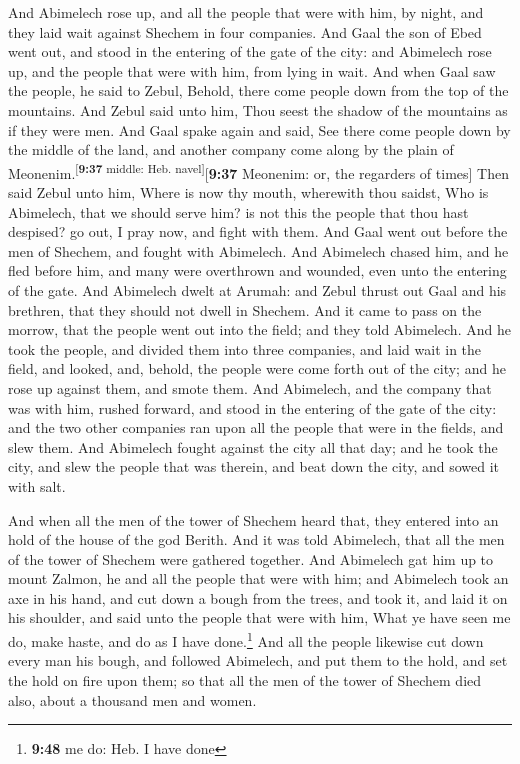  And Abimelech rose up, and all the people that were with
him, by night, and they laid wait against Shechem in four companies.
 And Gaal the son of Ebed went out, and stood in the
entering of the gate of the city: and Abimelech rose up, and the people
that were with him, from lying in wait.  And when Gaal
saw the people, he said to Zebul, Behold, there come people down from
the top of the mountains. And Zebul said unto him, Thou seest the shadow
of the mountains as if they were men.  And Gaal spake
again and said, See there come people down by the middle of the land,
and another company come along by the plain of
Meonenim.\textsuperscript{{[}\textbf{9:37} middle: Heb.
navel{]}}{[}\textbf{9:37} Meonenim: or, the regarders of times{]}
 Then said Zebul unto him, Where is now thy mouth,
wherewith thou saidst, Who is Abimelech, that we should serve him? is
not this the people that thou hast despised? go out, I pray now, and
fight with them.  And Gaal went out before the men of
Shechem, and fought with Abimelech.  And Abimelech chased
him, and he fled before him, and many were overthrown and wounded, even
unto the entering of the gate.  And Abimelech dwelt at
Arumah: and Zebul thrust out Gaal and his brethren, that they should not
dwell in Shechem.  And it came to pass on the morrow,
that the people went out into the field; and they told Abimelech.
 And he took the people, and divided them into three
companies, and laid wait in the field, and looked, and, behold, the
people were come forth out of the city; and he rose up against them, and
smote them.  And Abimelech, and the company that was with
him, rushed forward, and stood in the entering of the gate of the city:
and the two other companies ran upon all the people that were in the
fields, and slew them.  And Abimelech fought against the
city all that day; and he took the city, and slew the people that was
therein, and beat down the city, and sowed it with salt.

 And when all the men of the tower of Shechem heard that,
they entered into an hold of the house of the god Berith.
 And it was told Abimelech, that all the men of the tower
of Shechem were gathered together.  And Abimelech gat him
up to mount Zalmon, he and all the people that were with him; and
Abimelech took an axe in his hand, and cut down a bough from the trees,
and took it, and laid it on his shoulder, and said unto the people that
were with him, What ye have seen me do, make haste, and do as I have
done.\footnote{\textbf{9:48} me do: Heb. I have done} 
And all the people likewise cut down every man his bough, and followed
Abimelech, and put them to the hold, and set the hold on fire upon them;
so that all the men of the tower of Shechem died also, about a thousand
men and women.

